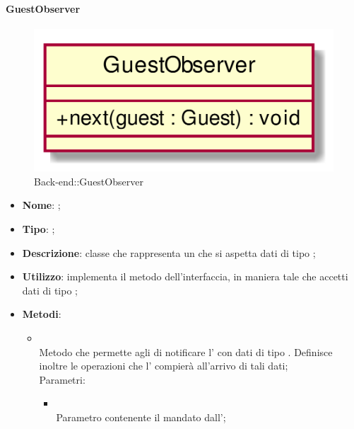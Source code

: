\hypertarget{GuestObserver_label}{\paragraph{GuestObserver}}
\begin{figure}[h]
	\centering
	\includegraphics[width=\textwidth,height=\textheight,keepaspectratio]{images/ClassGuestObserver.png}
	\caption{Back-end::GuestObserver}
\end{figure}
\begin{itemize}
	\item \textbf{Nome}: ;
	\item \textbf{Tipo}: ;
	\item \textbf{Descrizione}: classe che rappresenta un  che si aspetta dati di tipo ;
	\item \textbf{Utilizzo}: implementa il metodo  dell'interfaccia, in maniera tale che accetti dati di tipo ;
	\item \textbf{Metodi}:
	\begin{itemize}
		\item[]  \\
		Metodo che permette agli  di notificare l' con dati di tipo . Definisce inoltre le operazioni che l' compierà all'arrivo di tali dati;\\
		Parametri:
		\begin{itemize}
			\item {} \\
			Parametro contenente il  mandato dall';
		\end{itemize}
	\end{itemize}
\end{itemize}
\FloatBarrier

